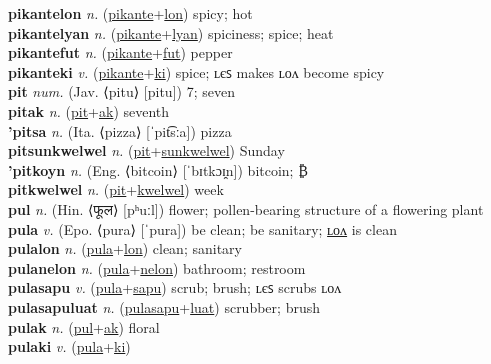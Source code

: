 \textbf{pikantelon} \textit{n.} (\hyperref[pikante]{pikante}+\hyperref[lon]{lon})
spicy; hot \label{pikantelon} \\
\textbf{pikantelyan} \textit{n.} (\hyperref[pikante]{pikante}+\hyperref[lyan]{lyan})
spiciness; spice; heat \label{pikantelyan} \\
\textbf{pikantefut} \textit{n.} (\hyperref[pikante]{pikante}+\hyperref[fut]{fut})
pepper \label{pikantefut} \\
\textbf{pikanteki} \textit{v.} (\hyperref[pikante]{pikante}+\hyperref[ki]{ki})
spice; ʟєꜱ makes ʟᴏᴧ become spicy \label{pikanteki} \\
\textbf{pit} \textit{num.} (Jav. ⟨pitu⟩ [pitu])
7; seven \label{pit} \\
\textbf{pitak} \textit{n.} (\hyperref[pit]{pit}+\hyperref[ak]{ak})
seventh \label{pitak} \\
\textbf{'pitsa} \textit{n.} (Ita. ⟨pizza⟩ [ˈpit͡sːa])
pizza \label{'pitsa} \\
\textbf{pitsunkwelwel} \textit{n.} (\hyperref[pit]{pit}+\hyperref[sunkwelwel]{sunkwelwel})
Sunday \label{pitsunkwelwel} \\
\textbf{'pitkoyn} \textit{n.} (Eng. ⟨bitcoin⟩ [ˈbɪtkɔɪ̯n])
bitcoin; ₿ \label{'pitkoyn} \\
\textbf{pitkwelwel} \textit{n.} (\hyperref[pit]{pit}+\hyperref[kwelwel]{kwelwel})
week \label{pitkwelwel} \\
\textbf{pul} \textit{n.} (Hin. ⟨फूल⟩ [pʰuːl])
flower; pollen-bearing structure of a flowering plant \label{pul} \\
\textbf{pula} \textit{v.} (Epo. ⟨pura⟩ [ˈpura])
be clean; be sanitary; \hyperref[pulalon]{ʟᴏᴧ} is clean \label{pula} \\
\textbf{pulalon} \textit{n.} (\hyperref[pula]{pula}+\hyperref[lon]{lon})
clean; sanitary \label{pulalon} \\
\textbf{pulanelon} \textit{n.} (\hyperref[pula]{pula}+\hyperref[nelon]{nelon})
bathroom; restroom \label{pulanelon} \\
\textbf{pulasapu} \textit{v.} (\hyperref[pula]{pula}+\hyperref[sapu]{sapu})
scrub; brush; ʟєꜱ scrubs ʟᴏᴧ \label{pulasapu} \\
\textbf{pulasapuluat} \textit{n.} (\hyperref[pulasapu]{pulasapu}+\hyperref[luat]{luat})
scrubber; brush \label{pulasapuluat} \\
\textbf{pulak} \textit{n.} (\hyperref[pul]{pul}+\hyperref[ak]{ak})
floral \label{pulak} \\
\textbf{pulaki} \textit{v.} (\hyperref[pula]{pula}+\hyperref[ki]{ki})
